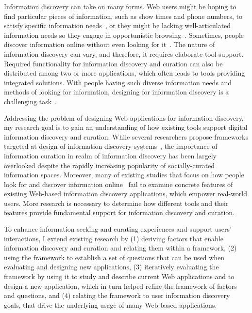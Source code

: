Information discovery can take on many forms. Web users might be hoping to find particular pieces of information, such as show times and phone numbers, to satisfy specific information needs~\cite{proper1999information}, or they might be lacking well-articulated information needs so they engage in opportunistic browsing~\cite{lindley2012s}. Sometimes, people discover information online without even looking for it~\cite{bates1986exploratory}. The nature of information discovery can vary, and therefore, it requires elaborate tool support. Required functionality for information discovery and curation can also be distributed among two or more applications, which often leads to tools providing integrated solutions. With people having such diverse information needs and methods of looking for information, designing for information discovery is a challenging task~\cite{conaway2010designing, marchionini2006exploratory}.

Addressing the problem of designing Web applications for information discovery, my research goal is to gain an understanding of how existing tools support digital information discovery and curation. While several researchers propose frameworks targeted at design of information discovery systems~\cite{proper1999information, kerne2004information}, the importance of information curation in realm of information discovery has been largely overlooked despite the rapidly increasing popularity of socially-curated information spaces. Moreover, many of existing studies that focus on how people look for and discover information online~\cite{bates1986exploratory, bates2002toward, choo2000information, ellis1989behavioural, ellis1993comparison, kellar2006goal, kellar2007field, lindley2012s, morrison2001taxonomic, sellen2002knowledge} fail to examine concrete features of existing Web-based information discovery applications, which empower real-world users. More research is necessary to determine how different tools and their features provide fundamental support for information discovery and curation.

To enhance information seeking and curating experiences and support users' interactions, I extend existing research by (1) deriving factors that enable information discovery and curation and relating them within a framework, (2) using the framework to establish a set of questions that can be used when evaluating and designing new applications, (3) iteratively evaluating the framework by using it to study and describe current Web applications and to design a new application, which in turn helped refine the framework of factors and questions, and (4) relating the framework to user information discovery goals, that drive the underlying usage of many Web-based applications. 

